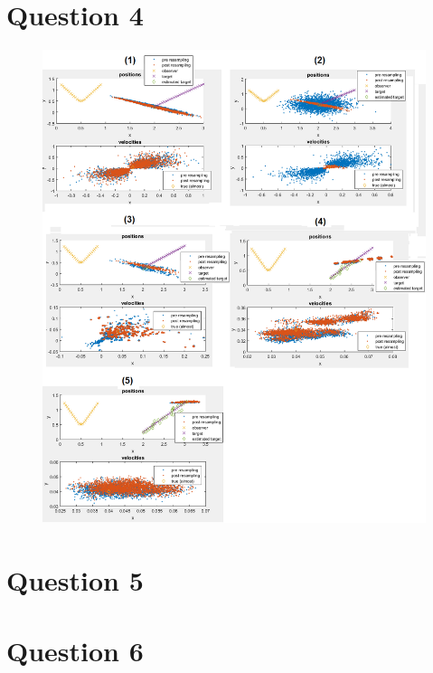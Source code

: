 \documentclass{article}
\begin{document}

\section*{Question 4}
\begin{figure}
   \caption{\label{q4} }
   \includegraphics[width=\textwidth,height=\textheight,keepaspectratio]{q4.png}
\end{figure}





\section*{Question 5}






\section*{Question 6}





\end{document}

